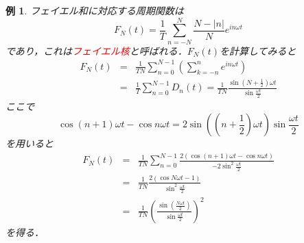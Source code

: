 \documentclass[a4j]{jsbook}
\newtheorem{example}[theorem]{例}
\numberwithin{theorem}{chapter}  %
\begin{document}
\begin{example} 
\label{ex2-8}
フェイエル和に対応する周期関数は
\begin{equation*}
    F_N(t)=\frac{1}{T}\sum_{n=-N}^N\frac{N-|n|}{N}e^{in\omega t}
\end{equation*}
であり，これは\textcolor{red}{フェイエル核}と呼ばれる．\(F_N(t)\)を計算してみると
\begin{eqnarray*}
F_N(t)&=&\frac{1}{TN}\sum_{n=0}^{N-1}\left(\sum_{k=-n}^n e^{in\omega t}\right) \\
&=&\frac{1}{T}\sum_{n=0}^{N-1}D_n(t)=\frac{1}{TN}\frac{\sin\left(N+\frac{1}{2}\right)\omega t}{\sin\frac{\omega t}{2}}
\end{eqnarray*}
ここで
\begin{equation*}
    \cos(n+1)\omega t-\cos n\omega t=2\sin\left(\left(n+\frac{1}{2}\right)\omega t\right)\sin\frac{\omega t}{2}
\end{equation*}
を用いると
\begin{eqnarray*}
F_N(t)&=&\frac{1}{TN}\sum_{n=0}^{N-1}\frac{2(\cos(n+1)\omega t-\cos n\omega t)}{-2\sin^2\frac{\omega t}{2}} \\
&=&\frac{1}{TN}\frac{2(\cos N\omega t-1)}{\sin^2\frac{\omega t}{2}} \\
&=&\frac{1}{TN}\left(\frac{\sin\left(\frac{N\omega t}{2}\right)}{\sin\frac{\omega t}{2}}\right)^2
\end{eqnarray*}
を得る．
\end{example}
\end{document}
